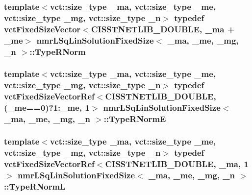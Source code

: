 \subsubsection[{Type\+R\+Norm}]{\setlength{\rightskip}{0pt plus 5cm}template$<$vct\+::size\+\_\+type \+\_\+ma, vct\+::size\+\_\+type \+\_\+me, vct\+::size\+\_\+type \+\_\+mg, vct\+::size\+\_\+type \+\_\+n$>$ typedef {\bf vct\+Fixed\+Size\+Vector}$<$C\+I\+S\+S\+T\+N\+E\+T\+L\+I\+B\+\_\+\+D\+O\+U\+B\+L\+E, \+\_\+ma + \+\_\+me$>$ {\bf nmr\+L\+Sq\+Lin\+Solution\+Fixed\+Size}$<$ \+\_\+ma, \+\_\+me, \+\_\+mg, \+\_\+n $>$\+::{\bf Type\+R\+Norm}}\label{classnmr_l_sq_lin_solution_fixed_size_a384dc1235386018c6edbdc782c5f84be}
\hypertarget{classnmr_l_sq_lin_solution_fixed_size_a8d12c1d86e766d8b7782e39f38b90073}{}
\subsubsection[{Type\+R\+Norm\+E}]{\setlength{\rightskip}{0pt plus 5cm}template$<$vct\+::size\+\_\+type \+\_\+ma, vct\+::size\+\_\+type \+\_\+me, vct\+::size\+\_\+type \+\_\+mg, vct\+::size\+\_\+type \+\_\+n$>$ typedef {\bf vct\+Fixed\+Size\+Vector\+Ref}$<$C\+I\+S\+S\+T\+N\+E\+T\+L\+I\+B\+\_\+\+D\+O\+U\+B\+L\+E, (\+\_\+me==0)?1\+:\+\_\+me, 1$>$ {\bf nmr\+L\+Sq\+Lin\+Solution\+Fixed\+Size}$<$ \+\_\+ma, \+\_\+me, \+\_\+mg, \+\_\+n $>$\+::{\bf Type\+R\+Norm\+E}}\label{classnmr_l_sq_lin_solution_fixed_size_a8d12c1d86e766d8b7782e39f38b90073}
\hypertarget{classnmr_l_sq_lin_solution_fixed_size_a61e14c469c463bc06a411061aad13b3a}{}
\subsubsection[{Type\+R\+Norm\+L}]{\setlength{\rightskip}{0pt plus 5cm}template$<$vct\+::size\+\_\+type \+\_\+ma, vct\+::size\+\_\+type \+\_\+me, vct\+::size\+\_\+type \+\_\+mg, vct\+::size\+\_\+type \+\_\+n$>$ typedef {\bf vct\+Fixed\+Size\+Vector\+Ref}$<$C\+I\+S\+S\+T\+N\+E\+T\+L\+I\+B\+\_\+\+D\+O\+U\+B\+L\+E, \+\_\+ma, 1$>$ {\bf nmr\+L\+Sq\+Lin\+Solution\+Fixed\+Size}$<$ \+\_\+ma, \+\_\+me, \+\_\+mg, \+\_\+n $>$\+::{\bf Type\+R\+Norm\+L}}\label{classnmr_l_sq_lin_solution_fixed_size_a61e14c469c463bc06a411061aad13b3a}
\hypertarget{classnmr_l_sq_lin_solution_fixed_size_a2804f3b3815a82a0f9655bcd2f86e7e4}{}
